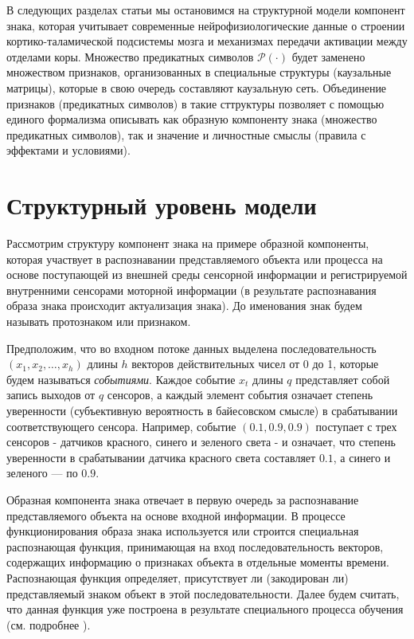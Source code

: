 \documentclass[12pt]{scrartcl}
\begin{document}
	В следующих разделах статьи мы остановимся на структурной модели компонент знака, которая учитывает современные нейрофизиологические данные о строении кортико-таламической подсистемы мозга и механизмах передачи активации между отделами коры. Множество предикатных символов $\mathcal P(\cdot)$ будет заменено множеством признаков, организованных в специальные структуры (каузальные матрицы), которые в свою очередь составляют каузальную сеть. Объединение признаков (предикатных символов) в такие сттруктуры позволяет с помощью единого формализма описывать как образную компоненту знака (множество предикатных символов), так и значение и личностные смыслы (правила с эффектами и условиями).
	
	\section{Структурный уровень модели}\label{sec:structure}
	
	Рассмотрим структуру компонент знака на примере образной компоненты, которая участвует в распознавании представляемого объекта или процесса на основе поступающей из внешней среды сенсорной информации и регистрируемой внутренними сенсорами моторной информации (в результате распознавания образа знака происходит актуализация знака). До именования знак будем называть протознаком или признаком.
	
	Предположим, что во входном потоке данных выделена последовательность $(x_1,x_2,\dots,x_h)$ длины $h$ векторов действительных чисел от 0 до 1, которые будем называться \textit{событиями}. Каждое событие $x_t$ длины $q$ представляет собой запись выходов от $q$ сенсоров, а каждый элемент события означает степень уверенности (субъективную вероятность в байесовском смысле) в срабатывании соответствующего сенсора. Например, событие $(0.1, 0.9, 0.9)$ поступает с трех сенсоров - датчиков красного, синего и зеленого света - и означает, что степень уверенности в срабатывании датчика красного света составляет $0.1$, а синего и зеленого --- по $0.9$.
	
	Образная компонента знака отвечает в первую очередь за распознавание представляемого объекта на основе входной информации. В процессе функционирования образа знака используется или строится специальная распознающая функция, принимающая на вход последовательность векторов, содержащих информацию о признаках объекта в отдельные моменты времени. Распознающая функция определяет, присутствует ли (закодирован ли) представляемый знаком объект в этой последовательности. Далее будем считать, что данная функция уже построена в результате специального процесса обучения (см. подробнее \cite{Panov2014d,Skrynnik2016}).
	
\end{document}
